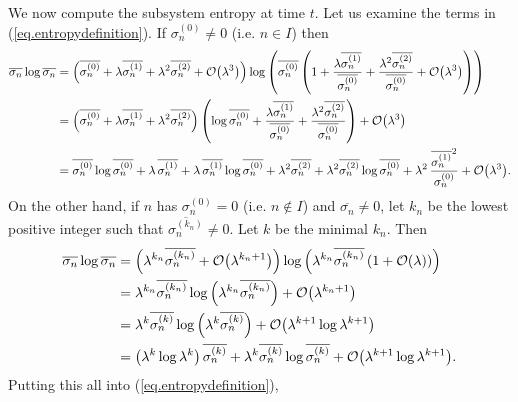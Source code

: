 We now compute the subsystem entropy at time \(t\). Let us examine the terms in (\ref{eq.entropydefinition}).
If \(\sigma_{n}^{(0)} \neq 0\) (i.e. \(n \in I\)) then
\begin{align*}
\overline{\sigma_n} \log \overline{\sigma_n}
&= \left(\overline{\sigma_n^{(0)}} + \lambda \overline{\sigma_n^{(1)}} + \lambda^2 \overline{\sigma_n^{(2)}} + \mathcal{O}{\left(\lambda^{3}\right)}\right) \log \left(\overline{\sigma_n^{(0)}} \left(1 + \frac{\lambda \overline{\sigma_n^{(1)}}}{\overline{\sigma_n^{(0)}}}+ \frac{\lambda^2 \overline{\sigma_n^{(2)}}}{\overline{\sigma_n^{(0)}}} + \mathcal{O}{\left(\lambda^{3}\right)}\right)\right) \\
&= \left(\overline{\sigma_n^{(0)}} + \lambda \overline{\sigma_n^{(1)}} + \lambda^2 \overline{\sigma_n^{(2)}}\right) \left(\log \overline{\sigma_n^{(0)}} + \frac{\lambda \overline{\sigma_n^{(1)}}}{\overline{\sigma_n^{(0)}}} + \frac{\lambda^2 \overline{\sigma_n^{(2)}}}{\overline{\sigma_n^{(0)}}}\right) + \mathcal{O}{\left(\lambda^{3}\right)}\\
&=  \overline{\sigma_n^{(0)}} \log \overline{\sigma_n^{(0)}} + \lambda\, \overline{\sigma_n^{(1)}}+\lambda\, \overline{\sigma_n^{(1)}}\log\overline{\sigma_n^{(0)}}+ \lambda^2 \overline{\sigma_n^{(2)}}+ \lambda^2 \overline{\sigma_n^{(2)}}\log\overline{\sigma_n^{(0)}} + \lambda^2\, \frac{\overline{\sigma_n^{(1)}}^2}{\sigma_n^{(0)}}+ \mathcal{O}{\left(\lambda^{3}\right)}.
\end{align*}
On the other hand, if \(n\) has \(\sigma_{n}^{(0)} = 0\) (i.e. \(n \not\in I\)) and \(\overline{\sigma_n}\neq 0\), let \(k_n\) be the lowest positive integer such that \(\overline{\sigma_n^{(k_n)}} \neq 0\). Let \(k\) be the minimal \(k_n\). Then
\begin{align*}
\overline{\sigma_n} \log \overline{\sigma_n}
&= \left(\lambda^{k_n}\overline{\sigma_n^{(k_n)}} + \mathcal{O}{\left(\lambda^{k_n+1}\right)}\right) \log\left(\lambda^{k_n}\overline{\sigma_n^{(k_n)}}\left(1 + \mathcal{O}{\left(\lambda\right)}\right)\right) \\
&= \lambda^{k_n}\overline{\sigma_n^{(k_n)}} \log\left(\lambda^{k_n}\overline{\sigma_n^{(k_n)}}\right)+ \mathcal{O}{\left(\lambda^{k_n+1}\right)}\\
&= \lambda^{k}\overline{\sigma_n^{(k)}} \log\left(\lambda^{k}\overline{\sigma_n^{(k)}}\right)+ \mathcal{O}{\left(\lambda^{k+1}\log\lambda^{k+1}\right)} \\
&= \left(\lambda^{k}\log\lambda^k\right)\overline{\sigma_n^{(k)}} + \lambda^{k}\overline{\sigma_n^{(k)}} \log\overline{\sigma_n^{(k)}}+ \mathcal{O}{\left(\lambda^{k+1}\log\lambda^{k+1}\right)}.
\end{align*}
Putting this all into (\ref{eq.entropydefinition}),
